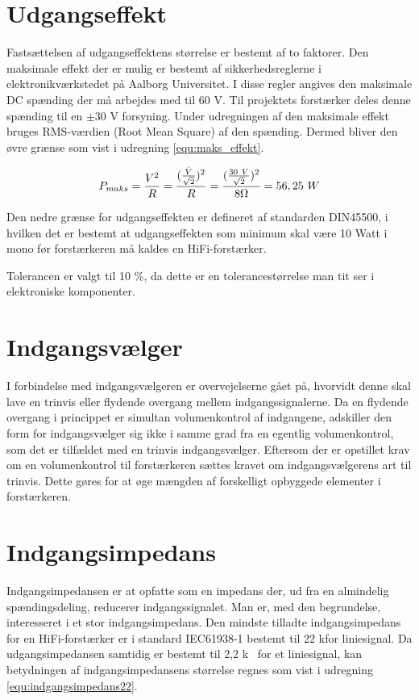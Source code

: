 \section{Udgangseffekt}
\label{krav_udgangseffekt}
Fastsættelsen af udgangseffektens størrelse er bestemt af to faktorer. Den maksimale effekt der er mulig er bestemt af sikkerhedsreglerne i elektronikværkstedet på Aalborg Universitet. I disse regler angives den maksimale DC spænding der må arbejdes med til 60 V. Til projektets forstærker deles denne spænding til en $\pm$30 V forsyning. Under udregningen af den maksimale effekt bruges RMS-værdien (Root Mean Square) af den spænding. Dermed bliver den øvre grænse som vist i udregning \ref{equ:maks_effekt}.

\begin{equation}
\label{equ:maks_effekt}
P_{maks} = \frac{V^2}{R}= \frac{(\frac{\hat{V}}{\sqrt{2}})^2}{R} = \frac{(\frac{30~V}{\sqrt{2}})^2}{8\ohm} = 56,25~W
\end{equation}

Den nedre grænse for udgangseffekten er defineret af standarden DIN45500, i hvilken det er bestemt at udgangseffekten som minimum skal være 10 Watt i mono før forstærkeren må kaldes en HiFi-forstærker.

Tolerancen er valgt til 10 \%, da dette er en tolerancestørrelse man tit ser i elektroniske komponenter.

\section{Indgangsvælger}
\label{krav_indgangsvaelger}
I forbindelse med indgangsvælgeren er overvejelserne gået på, hvorvidt denne skal lave en trinvis eller flydende overgang mellem indgangssignalerne. Da en flydende overgang i princippet er simultan volumenkontrol af indgangene, adskiller den form for indgangsvælger sig ikke i samme grad fra en egentlig volumenkontrol, som det er tilfældet med en trinvis indgangsvælger. Eftersom der er opstillet krav om en volumenkontrol til forstærkeren sættes kravet om indgangsvælgerens art til trinvis. Dette gøres for at øge mængden af forskelligt opbyggede elementer i forstærkeren. 

\section{Indgangsimpedans}
\label{krav_indgangsimpedans}
Indgangsimpedansen er at opfatte som en impedans der, ud fra en almindelig spændingsdeling, reducerer indgangssignalet. Man er, med den begrundelse, interesseret i et stor indgangsimpedans. Den mindste tilladte indgangsimpedans for en HiFi-forstærker er i standard IEC61938-1 bestemt til 22 k\ohm for liniesignal. Da udgangsimpedansen samtidig er bestemt til 2,2 k\ohm~ for et liniesignal, kan betydningen af indgangsimpedansens størrelse regnes som vist i udregning \ref{equ:indgangsimpedans22}. 

